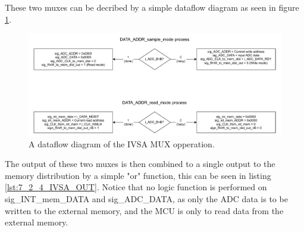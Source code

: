 These two muxes can be decribed by a simple dataflow diagram as seen in figure \ref{fig_7_2_4_IVSA_MUX}.

\begin{figure}[H]
    \centering
    \includegraphics[clip, trim=0 0 0 0, width=1\textwidth]{Sections/7_SystemDesign/Figures/SMPLT_MUX.pdf}
    \caption{A dataflow diagram of the IVSA MUX opperation.}
    \label{fig_7_2_4_IVSA_MUX}
\end{figure}

The output of these two muxes is then combined to a single output to the memory distribution by a simple "or" function, this can be seen in listing \ref{lst:7_2_4_IVSA_OUT}. Notice that no logic function is performed on sig\_INT\_mem\_DATA and sig\_ADC\_DATA, as only the ADC data is to be written to the external memory, and the MCU is only to read data from the external memory.


